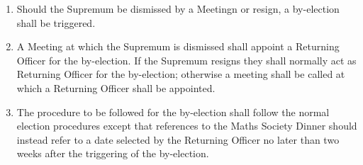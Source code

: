 \documentclass[pdftex,a4paper]{report}
\begin{document}
\begin{enumerate}[resume*]
	\item Should the Supremum be dismissed by a Meetingn or resign, a by-election shall be triggered.
	\item A Meeting at which the Supremum is dismissed shall appoint a Returning Officer for the by-election. If the Supremum resigns they shall normally act as Returning Officer for the by-election; otherwise a meeting shall be called at which a Returning Officer shall be appointed.
	\item The procedure to be followed for the by-election shall follow the normal election procedures except that references to the Maths Society Dinner should instead refer to a date selected by the Returning Officer no later than two weeks after the triggering of the by-election.
\end{enumerate}
\end{document}

